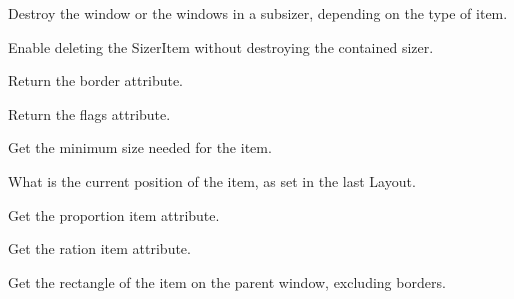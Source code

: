 \label{wxsizeritemdeletewindows}


Destroy the window or the windows in a subsizer, depending on the type
of item.


\label{wxsizeritemdetachsizer}


Enable deleting the SizerItem without destroying the contained sizer.


\label{wxsizeritemgetborder}


Return the border attribute.

\label{wxsizeritemgetflag}


Return the flags attribute.


\label{wxsizeritemgetminsize}


Get the minimum size needed for the item.

\label{wxsizeritemgetposition}


What is the current position of the item, as set in the last Layout.

\label{wxsizeritemgetproportion}


Get the proportion item attribute.

\label{wxsizeritemgetratio}


Get the ration item attribute.

\label{wxsizeritemgetrect}


Get the rectangle of the item on the parent window, excluding borders.

\label{wxsizeritemgetsize}

